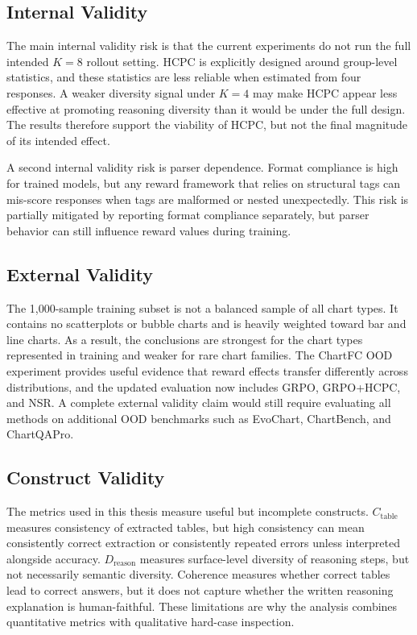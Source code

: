 \documentclass{iutbscthesis}
\begin{document}
\subsection{Internal Validity}

The main internal validity risk is that the current experiments do not run the full intended $K=8$ rollout setting. HCPC is explicitly designed around group-level statistics, and these statistics are less reliable when estimated from four responses. A weaker diversity signal under $K=4$ may make HCPC appear less effective at promoting reasoning diversity than it would be under the full design. The results therefore support the viability of HCPC, but not the final magnitude of its intended effect.

A second internal validity risk is parser dependence. Format compliance is high for trained models, but any reward framework that relies on structural tags can mis-score responses when tags are malformed or nested unexpectedly. This risk is partially mitigated by reporting format compliance separately, but parser behavior can still influence reward values during training.

\subsection{External Validity}

The 1,000-sample training subset is not a balanced sample of all chart types. It contains no scatterplots or bubble charts and is heavily weighted toward bar and line charts. As a result, the conclusions are strongest for the chart types represented in training and weaker for rare chart families. The ChartFC OOD experiment provides useful evidence that reward effects transfer differently across distributions, and the updated evaluation now includes GRPO, GRPO+HCPC, and NSR. A complete external validity claim would still require evaluating all methods on additional OOD benchmarks such as EvoChart, ChartBench, and ChartQAPro.

\subsection{Construct Validity}

The metrics used in this thesis measure useful but incomplete constructs. $C_{\text{table}}$ measures consistency of extracted tables, but high consistency can mean consistently correct extraction or consistently repeated errors unless interpreted alongside accuracy. $D_{\text{reason}}$ measures surface-level diversity of reasoning steps, but not necessarily semantic diversity. Coherence measures whether correct tables lead to correct answers, but it does not capture whether the written reasoning explanation is human-faithful. These limitations are why the analysis combines quantitative metrics with qualitative hard-case inspection.
\end{document}
